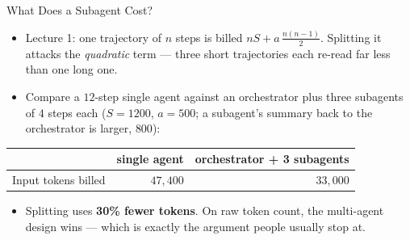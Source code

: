 \begin{frame}{What Does a Subagent Cost?}
\small
\begin{itemize}
  \item Lecture 1: one trajectory of $n$ steps is billed $nS + a\,\frac{n(n-1)}{2}$. Splitting it attacks the \emph{quadratic} term --- three short trajectories each re-read far less than one long one.
  \pause
  \item Compare a $12$-step single agent against an orchestrator plus three subagents of $4$ steps each ($S=1200$, $a=500$; a subagent's summary back to the orchestrator is larger, $800$):
\end{itemize}
\pause
\centering
\footnotesize
\begin{tabular}{l|rr}
 & \textbf{single agent} & \textbf{orchestrator + 3 subagents} \\
\hline
Input tokens billed & $47{,}400$ & $33{,}000$ \\
\end{tabular}

\vspace{0.5em}
\small
\begin{itemize}
  \item Splitting uses \textbf{30\% fewer tokens}. On raw token count, the multi-agent design wins --- which is exactly the argument people usually stop at.
\end{itemize}
\end{frame}


